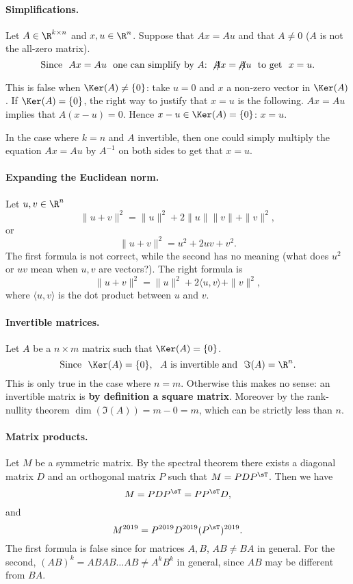 \documentclass[11pt,nocut]{article}
\begin{document}
\paragraph{Simplifications.}
Let $A \in \R^{k \times n}$ and $x,u \in \R^n$. Suppose that $Ax=Au$ and that $A \neq 0$ ($A$ is not the all-zero matrix).
{\color{red}
	$$
	\text{Since} \ \ Ax=Au \ \ \text{one can simplify by $A$:} \ \ \xout{A} x = \xout{A} u \ \ \text{to get} \ \ x=u.
	$$
}
This is false when $\Ker(A) \neq \{0\}$: take $u=0$ and $x$ a non-zero vector in $\Ker(A)$. If $\Ker(A) = \{0\}$, the right way to justify that $x=u$ is the following. $Ax = Au$ implies that $A(x-u) = 0$. Hence $x-u \in \Ker(A) = \{0\}$: $x=u$.

In the case where $k=n$ and $A$ invertible, then one could simply multiply the equation $Ax = Au$ by $A^{-1}$ on both sides to get that $x=u$.

\paragraph{Expanding the Euclidean norm.}
Let $u,v \in \R^n$
{\color{red}
	$$
	\|u+v\|^2 = \|u\|^2 + 2 \|u\| \|v\| + \|v\|^2,
	$$
	or
	$$
	\|u+v\|^2 = u^2 + 2 u v + v^2.
	$$
}
The first formula is not correct, while the second has no meaning (what does $u^2$ or $uv$ mean when $u,v$ are vectors?). The right formula is
$$
\|u+v\|^2 = \|u\|^2 + 2 \langle u , v\rangle + \|v\|^2,
$$
where $\langle u,v \rangle$ is the dot product between $u$ and $v$.

\paragraph{Invertible matrices.} Let $A$ be a $n \times m$ matrix such that $\Ker(A) = \{0\}$.
{\color{red}
	$$
	\text{Since} \ \ \Ker(A) = \{0\}, \ \ A \ \text{is invertible and} \ \ \Im(A) = \R^n. 
	$$
}
This is only true in the case where $n=m$. Otherwise this makes no sense: an invertible matrix is \textbf{by definition a square matrix}. Moreover by the rank-nullity theorem $\dim (\Im(A)) = m - 0 = m$, which can be strictly less than $n$.

\paragraph{Matrix products.} Let $M$ be a symmetric matrix. By the spectral theorem there exists a diagonal matrix $D$ and an orthogonal matrix $P$ such that $M = P D P^{\sT}$. Then we have
{\color{red}
	$$
	M = P D P^{\sT} = P P^{\sT} D,
	$$
	and
	$$
	M^{2019} = P^{2019} D^{2019} (P^{\sT})^{2019}.
	$$
}
The first formula is false since for matrices $A,B$, $AB\neq BA$ in general. For the second, $(AB)^k = ABAB \dots AB \neq A^k B^k$ in general, since $AB$ may be different from $BA$.





\vspace{1cm}
\centerline{}

%
%
\end{document}
